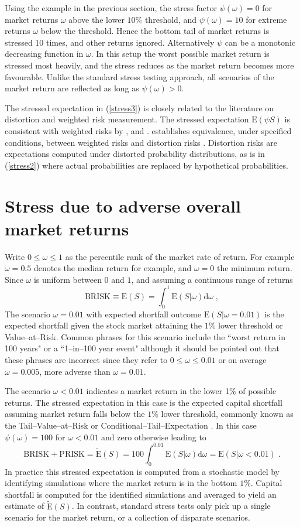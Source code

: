 \documentclass[authoryear]{elsarticle}
\newcommand{\E}{{\mathrm E}}
\newcommand{\de}{\mathrm{d}}
\newcommand{\eref}[1]{(\ref{#1})}
\newcommand{\br}{\ensuremath{\mathrm{BRISK}}}
\newcommand{\pr}{\ensuremath{\mathrm{PRISK}}}
\begin{document}
Using the example in the previous section, the stress factor $\psi(\omega)=0$ for market returns $\omega$ above the lower $10\%$ threshold, and $\psi(\omega)=10$ for extreme returns $\omega$ below the threshold. Hence the bottom tail of market returns is stressed 10 times, and  other returns  ignored. Alternatively $\psi$ can be a monotonic decreasing  function in $\omega$. In this setup the worst possible market return is stressed most heavily, and the stress reduces as the market return becomes more favourable.  Unlike the standard stress testing approach, all scenarios of the market return are reflected as long as $\psi(\omega)>0$.

The stressed expectation in \eref{stress3} is closely related to the literature on distortion and weighted risk measurement. The stressed expectation $\E(\psi S)$ is consistent with weighted risks by \cite{furman2008weighted1}, \cite{choo2009loss} and \cite{choo2010determining}. \cite{choo2009loss} establishes equivalence, under specified conditions, between weighted risks and distortion risks \citep{wang2000class}. Distortion risks are expectations computed under distorted probability distributions, as is in \eref{stress2} where actual probabilities are replaced by hypothetical probabilities.

\section{Stress due to adverse overall market returns}\label{s_stmarket}

 Write $0\le \omega\le 1$ as the percentile rank of the market rate of return. For example $\omega=0.5$ denotes the median return for example, and $\omega=0$  the minimum return. Since $\omega$ is uniform between $0$ and $1$, and assuming a continuous range of returns
 $$
 \br\equiv\E(S) = \int_0^1 \E(S|\omega) \de \omega\;,
$$
The scenario $\omega=0.01$ with expected shortfall outcome $\E(S|\omega=0.01)$ is the expected shortfall given the stock market attaining the $1\%$ lower threshold or Value--at--Risk. Common phrases for this scenario include the ``worst return in 100 years" or a ``1--in--100 year event" although it should be pointed out that these phrases are incorrect since they refer to $0\le \omega\le 0.01$ or on average $\omega=0.005$, more adverse than $\omega=0.01$.

The scenario $\omega<0.01$ indicates a market return in the lower 1\% of possible returns. The stressed expectation in this case is the expected capital shortfall assuming market return falls below the $1\%$ lower threshold, commonly known as the Tail--Value--at--Risk or Conditional--Tail--Expectation \citep{mcneil2005qrm}.  In this case $\psi(\omega)=100$ for $\omega<0.01$ and zero otherwise leading to
$$
\br+\pr=\widetilde \E(S)  = 100\int_0^{0.01}\E(S|\omega) \de \omega
= \E(S|\omega<0.01) \;.
$$
In practice this stressed expectation is computed from a stochastic model by identifying simulations where the market return is in the bottom $1\%$. Capital shortfall is computed for the identified simulations and averaged to yield an estimate of $\widetilde \E(S)$. In contrast, standard stress tests only pick up a single scenario for the market return, or a collection of disparate scenarios.
\end{document}
